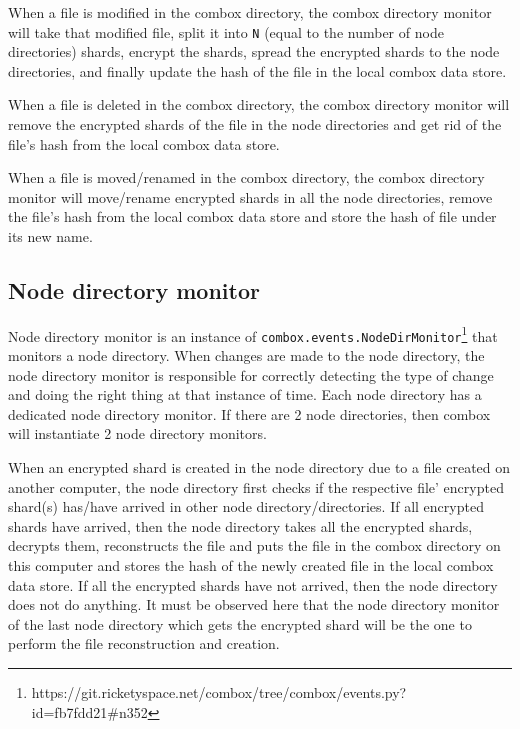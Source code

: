 When a file is modified in the combox directory, the combox directory
monitor will take that modified file, split it into \verb+N+ (equal to
the number of node directories) shards, encrypt the shards, spread the
encrypted shards to the node directories, and finally update the hash
of the file in the local combox data store.

When a file is deleted in the combox directory, the combox directory
monitor will remove the encrypted shards of the file in the node
directories and get rid of the file's hash from the local combox
data store.

When a file is moved/renamed in the combox directory, the combox
directory monitor will move/rename encrypted shards in all the node
directories, remove the file's hash from the local combox data store
and store the hash of file under its new name.

\subsection{Node directory monitor}\label{sec:3-combox-nodirm}

Node directory monitor is an instance of
\verb+combox.events.NodeDirMonitor+\footnote{https://git.ricketyspace.net/combox/tree/combox/events.py?id=fb7fdd21\#n352}
that monitors a node directory. When changes are made to the node
directory, the node directory monitor is responsible for correctly
detecting the type of change and doing the right thing at that
instance of time. Each node directory has a dedicated node directory
monitor. If there are 2 node directories, then combox will instantiate
2 node directory monitors.

When an encrypted shard is created in the node directory due to a file
created on another computer, the node directory first checks if the
respective file' encrypted shard(s) has/have arrived in other node
directory/directories. If all encrypted shards have arrived, then the
node directory takes all the encrypted shards, decrypts them,
reconstructs the file and puts the file in the combox directory on
this computer and stores the hash of the newly created file in the
local combox data store. If all the encrypted shards have not arrived,
then the node directory does not do anything. It must be observed here
that the node directory monitor of the last node directory which gets
the encrypted shard will be the one to perform the file reconstruction
and creation.

